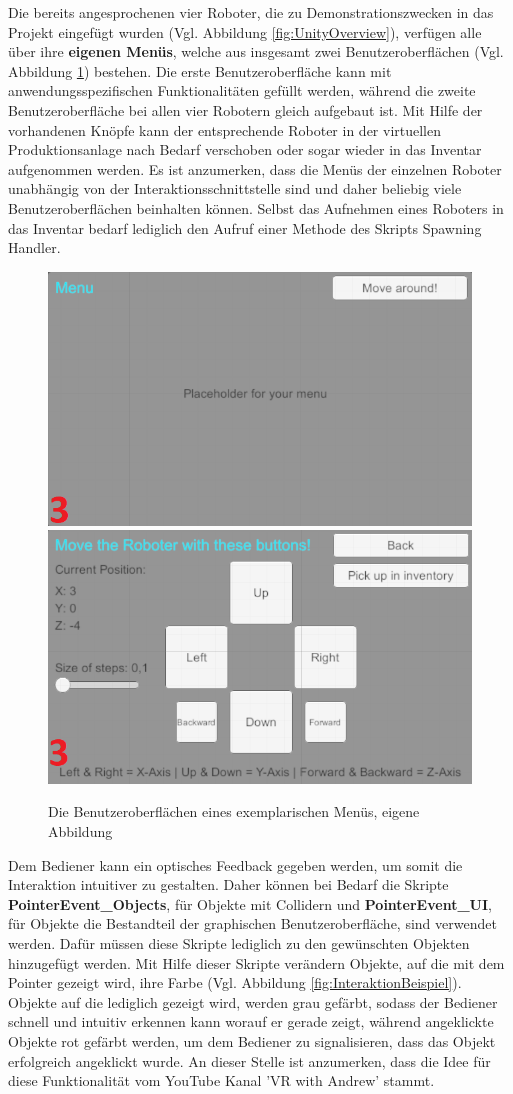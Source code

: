 Die bereits angesprochenen vier Roboter, die zu Demonstrationszwecken in das Projekt eingefügt wurden (Vgl. Abbildung \ref{fig:UnityOverview}), verfügen alle über ihre \textbf{eigenen Menüs}, welche aus insgesamt zwei Benutzeroberflächen (Vgl. Abbildung \ref{fig:BspMenu}) bestehen. Die erste Benutzeroberfläche kann mit anwendungsspezifischen Funktionalitäten gefüllt werden, während die zweite Benutzeroberfläche bei allen vier Robotern gleich aufgebaut ist. Mit Hilfe der vorhandenen Knöpfe kann der entsprechende Roboter in der virtuellen Produktionsanlage nach Bedarf verschoben oder sogar wieder in das Inventar aufgenommen werden. Es ist anzumerken, dass die Menüs der einzelnen Roboter unabhängig von der Interaktionsschnittstelle sind und daher beliebig viele Benutzeroberflächen beinhalten können. Selbst das Aufnehmen eines Roboters in das Inventar bedarf lediglich den Aufruf einer Methode des Skripts Spawning Handler.
\begin{figure}[h]
	\centering
	\includegraphics[width=0.45\linewidth]{Bilder/A52_OM1_2}
	\includegraphics[width=0.45\linewidth]{Bilder/A53_OM2_2}
	\caption{Die Benutzeroberflächen eines exemplarischen Menüs, eigene Abbildung}
	\label{fig:BspMenu}
\end{figure}
\newline
Dem Bediener kann ein optisches Feedback gegeben werden, um somit die Interaktion intuitiver zu gestalten. Daher können bei Bedarf die Skripte \textbf{PointerEvent\_Objects}, für Objekte mit Collidern und \textbf{PointerEvent\_UI}, für Objekte die Bestandteil der graphischen Benutzeroberfläche, sind verwendet werden. Dafür müssen diese Skripte lediglich zu den gewünschten Objekten hinzugefügt werden. Mit Hilfe dieser Skripte verändern Objekte, auf die mit dem Pointer gezeigt wird, ihre Farbe (Vgl. Abbildung \ref{fig:InteraktionBeispiel}). Objekte auf die lediglich gezeigt wird, werden grau gefärbt, sodass der Bediener schnell und intuitiv erkennen kann worauf er gerade zeigt, während angeklickte Objekte rot gefärbt werden, um dem Bediener zu signalisieren, dass das Objekt erfolgreich angeklickt wurde. An dieser Stelle ist anzumerken, dass die Idee für diese Funktionalität vom YouTube Kanal 'VR with Andrew' \cite{32} stammt.
\newpage

